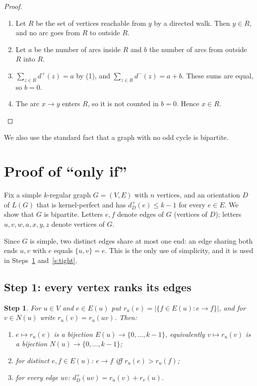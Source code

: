 \documentclass[11pt]{article}
\theoremstyle{plain}
\newtheorem{claim}{Step}
\theoremstyle{definition}
\newcommand{\LG}{L(G)}
\newcommand{\st}[1]{E(#1)}
\newcommand{\dout}{d^{+}}
\newcommand{\din}{d^{-}}
\newenvironment{steps}{\begin{enumerate}[label=(\arabic*),leftmargin=2.2em,itemsep=0.35em]}{\end{enumerate}}
\begin{document}
\begin{proof}
\begin{steps}
  \item Let $R$ be the set of vertices reachable from $y$ by a directed walk. Then $y\in R$, and
    no arc goes from $R$ to outside $R$.
  \item Let $a$ be the number of arcs inside $R$ and $b$ the number of arcs from outside $R$ into
    $R$.
  \item $\sum_{z\in R}\dout(z)=a$ by (1), and $\sum_{z\in R}\din(z)=a+b$. These sums are equal,
    so $b=0$.
  \item The arc $x\to y$ enters $R$, so it is not counted in $b=0$. Hence $x\in R$. \qedhere
\end{steps}
\end{proof}

We also use the standard fact that a graph with no odd cycle is bipartite.

\section*{Proof of ``only if''}

Fix a simple $k$-regular graph $G=(V,E)$ with $n$ vertices, and an orientation $D$ of $\LG$ that
is kernel-perfect and has $\dout_D(e)\le k-1$ for every $e\in E$. We show that $G$ is
bipartite. Letters $e,f$ denote edges of $G$ (vertices of $D$); letters $u,v,w,a,x,y,z$ denote
vertices of $G$.

Since $G$ is simple, two distinct edges share at most one end: an edge sharing both ends $u,v$
with $e$ equals $\{u,v\}=e$. This is the only use of simplicity, and it is used in
Steps~\ref{s:rank} and~\ref{s:tight}.

\subsection*{Step 1: every vertex ranks its edges}

\begin{claim}\label{s:rank}
For $u\in V$ and $e\in\st{u}$ put $r_u(e)=|\{f\in\st{u}: e\to f\}|$, and for $v\in N(u)$ write
$r_u(v)=r_u(uv)$. Then:
\begin{enumerate}[label=(\alph*)]
  \item $e\mapsto r_u(e)$ is a bijection $\st{u}\to\{0,\dots,k-1\}$, equivalently
    $v\mapsto r_u(v)$ is a bijection $N(u)\to\{0,\dots,k-1\}$;
  \item for distinct $e,f\in\st{u}$: $e\to f$ iff $r_u(e)>r_u(f)$;
  \item for every edge $uv$: $\dout_D(uv)=r_u(v)+r_v(u)$.
\end{enumerate}
\end{claim}
\end{document}
